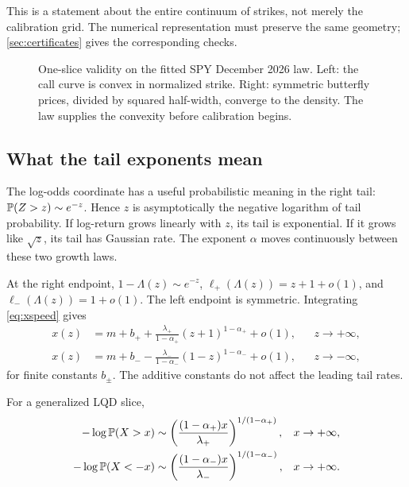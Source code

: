 This is a statement about the entire continuum of strikes, not merely the
calibration grid.  The numerical representation must preserve the same
geometry; \cref{sec:certificates} gives the corresponding checks.

\begin{figure}[htbp]
\centering
{}
\caption{One-slice validity on the fitted SPY December 2026 law.  Left: the
call curve is convex in normalized strike.  Right: symmetric butterfly prices,
divided by squared half-width, converge to the density.  The law supplies the
convexity before calibration begins.}
\label{fig:butterfly}
\end{figure}

\subsection{What the tail exponents mean}
\label{sec:tails}

The log-odds coordinate has a useful probabilistic meaning in the right tail:
$\mathbb{P}(Z>z)\sim e^{-z}$.  Hence $z$ is asymptotically the negative logarithm
of tail probability.  If log-return grows linearly with $z$, its tail is
exponential.  If it grows like $\sqrt z$, its tail has Gaussian rate.  The
exponent $\alpha$ moves continuously between these two growth laws.

At the right endpoint, $1-\Lambda(z)\sim e^{-z}$,
$\ell_+(\Lambda(z))=z+1+o(1)$, and $\ell_-(\Lambda(z))=1+o(1)$.
The left endpoint is symmetric.  Integrating \eqref{eq:xspeed} gives
\begin{align}
x(z)&=m+b_+
+\frac{\lambda_+}{1-\alpha_+}(z+1)^{1-\alpha_+}+o(1),
&&z\to+\infty,
\label{eq:righttransporttail}\\
x(z)&=m+b_-
-\frac{\lambda_-}{1-\alpha_-}(1-z)^{1-\alpha_-}+o(1),
&&z\to-\infty,
\label{eq:lefttransporttail}
\end{align}
for finite constants $b_\pm$.  The additive constants do not affect the
leading tail rates.

\begin{proposition}
\label{prop:tails}
For a generalized LQD slice,
\begin{align}
-\log\mathbb{P}(X>x)
&\sim
\left(\frac{(1-\alpha_+)x}{\lambda_+}\right)^{1/(1-\alpha_+)},
&&x\to+\infty,
\label{eq:righttailrate}\\
-\log\mathbb{P}(X<-x)
&\sim
\left(\frac{(1-\alpha_-)x}{\lambda_-}\right)^{1/(1-\alpha_-)},
&&x\to+\infty.
\label{eq:lefttailrate}
\end{align}
\end{proposition}

